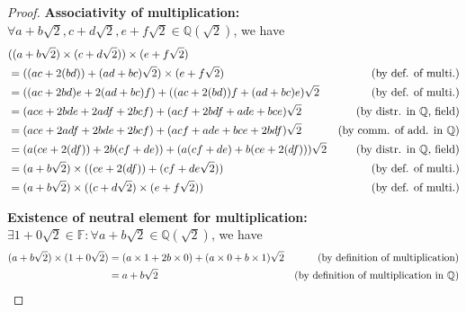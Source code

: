 \documentclass[10pt]{article}
\newcommand{\F}{\mathbb{F}}
\newcommand{\Q}{\mathbb{Q}}
\newenvironment{problem}[2][Problem]{\begin{trivlist}
\item[\hskip \labelsep {\bfseries #1}\hskip \labelsep {\bfseries #2.}]}{\end{trivlist}}
\begin{document}
\begin{problem}{4}
\begin{enumerate}
\begin{proof}
                \textbf{Associativity of multiplication:} \( \forall a + b\sqrt{2}, c + d\sqrt{2}, e + f\sqrt{2} \in \Q(\sqrt{2}) \), we have
                \begin{align*}
                    & ((a + b\sqrt{2}) \times (c + d\sqrt{2})) \times (e + f\sqrt{2}) \\
                    &= ((ac + 2(bd)) + (ad + bc)\sqrt{2}) \times (e + f\sqrt{2}) & \text{(by def. of multi.)} \hfill \\
                    &= ((ac + 2bd)e + 2(ad + bc)f) + ((ac + 2(bd))f + (ad + bc)e)\sqrt{2} & \text{(by def. of multi.)} \hfill \\
                    & = (ace + 2bde + 2adf + 2bcf) + (acf + 2bdf + ade + bce)\sqrt{2} & \text{(by distr. in $\Q$, field)} \hfill \\
                    & = (ace + 2adf + 2bde + 2bcf) + (acf + ade + bce + 2bdf)\sqrt{2} & \text {(by comm. of add. in $\Q$)} \hfill \\
                    &= (a(ce + 2(df)) + 2b(cf + de)) + (a(cf + de) + b(ce + 2(df)))\sqrt{2} & \text{(by distr. in $\Q$, field)} \hfill \\
                    &= (a + b\sqrt{2}) \times ((ce + 2(df)) + (cf + de\sqrt{2})) & \text{(by def. of multi.)} \hfill \\
                    &= (a + b\sqrt{2}) \times ((c + d\sqrt{2}) \times (e + f\sqrt{2})) & \text{(by def. of multi.)} \hfill
                \end{align*}

                \textbf{Existence of neutral element for multiplication:} \( \exists 1 + 0\sqrt{2} \in \F \colon \forall a + b\sqrt{2} \in \Q(\sqrt{2}) \), we have
                \begin{align*}
                    (a + b\sqrt{2}) \times (1 + 0\sqrt{2}) &= (a \times 1 + 2b \times 0) + (a \times 0 + b \times 1)\sqrt{2} & \text{(by definition of multiplication)} \hfill \\
                                                          &= a + b\sqrt{2} & \text{(by definition of multiplication in $\Q$)} \hfill
                \end{align*}


\end{proof}
\end{enumerate}
\end{problem}
\end{document}
